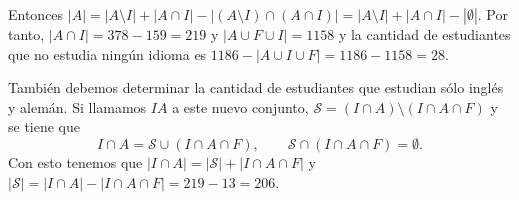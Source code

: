 \begin{ejemplo}
	Entonces $|A| = |A\setminus I| + |A \cap I| - |(A\setminus I)\cap (A\cap I)| = 
	|A\setminus I| + |A \cap I| - |\emptyset|$.
	Por tanto, $|A \cap I| = 378 - 159 = 219$ y
	$|A \cup F \cup I| = 1158$ y 
	la cantidad de estudiantes que no estudia ning\'un
	idioma es $1186 - |A\cup I\cup F| = 1186-1158 = 28$.
	
	Tambi\'en debemos determinar la cantidad de estudiantes 
	que estudian s\'olo ingl\'es
	y alem\'an. Si llamamos 
	$IA$ a este nuevo conjunto, 
	${\mathcal S }= (I \cap A)\setminus (I\cap A \cap F)$ 
	y se tiene que 
	\[
		I\cap A = {\mathcal S} \cup (I\cap A \cap F),\qquad 
		{\mathcal S} \cap (I\cap A \cap F) = \emptyset.
	\]
	Con esto tenemos que 
	$|I\cap A| = |{\mathcal S}| + |I \cap A \cap F|$
	y $|{\mathcal S}| = |I\cap A| - |I \cap A \cap F|
	= 219 - 13 = 206$.			
\end{ejemplo}

